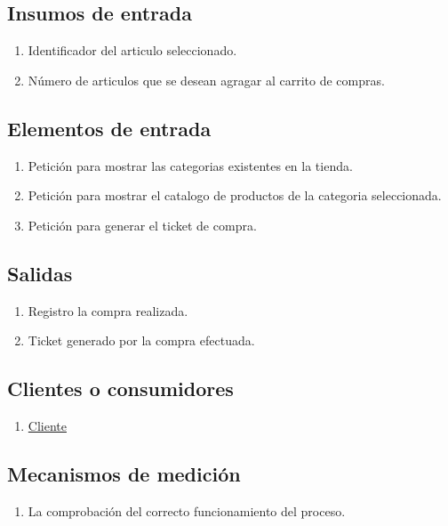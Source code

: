 \newpage	
\subsection{Insumos de entrada}
	\begin{enumerate}
		\item Identificador del articulo seleccionado.
		\item N\'umero de articulos que se desean agragar al carrito de compras.
	\end{enumerate}
	
\subsection{Elementos de entrada}
	\begin{enumerate}
		\item Petici\'on para mostrar las categorias existentes en la tienda.
		\item Petici\'on para mostrar el catalogo de productos de la categoria seleccionada.
		\item Petici\'on para generar el ticket de compra.
	\end{enumerate}
	
	
\subsection{Salidas}
	\begin{enumerate}
		\item Registro la compra realizada.
		\item Ticket generado por la compra efectuada.
	\end{enumerate}
	
	
\subsection{Clientes o consumidores}
	\begin{enumerate}
		\item \hyperlink{Cliente}{Cliente}
	\end{enumerate}
	
	
\subsection{Mecanismos de medici\'on}
	\begin{enumerate}
		\item La comprobaci\'on del correcto funcionamiento del proceso.
	\end{enumerate}
	

